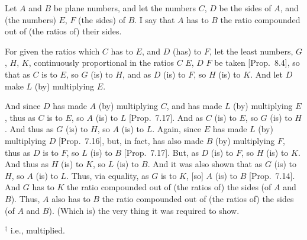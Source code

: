 \begin{Parallel}{}{}
{Let $A$ and $B$ be plane numbers, and let the numbers $C$, $D$ be the
sides of $A$, and (the numbers) $E$, $F$ (the sides) of $B$. I say that $A$ has to $B$ the ratio compounded out of (the ratios of)  their sides.

For given the ratios which $C$ has to $E$, and $D$ (has) to $F$, let the least numbers, $G$, $H$, $K$, continuously proportional in the
ratios $C$ $E$, $D$ $F$ be taken [Prop.~8.4], so that as $C$ is to $E$, so
$G$ (is) to $H$, and as $D$ (is) to $F$, so $H$ (is) to $K$. And let $D$ make $L$ (by) multiplying $E$. 

And since $D$ has made $A$ (by) multiplying $C$, and has made $L$ (by)
multiplying $E$, thus as $C$ is to  $E$, so $A$ (is) to $L$ [Prop.~7.17]. And as $C$ (is) to $E$, so $G$ (is) to
$H$. And thus as $G$ (is) to $H$, so $A$ (is) to $L$. Again, since
$E$ has made $L$ (by) multiplying $D$ [Prop.~7.16],
but, in fact, has also made $B$ (by) multiplying $F$, thus as $D$ is to 
$F$, so $L$ (is) to $B$  [Prop.~7.17]. But,
as $D$ (is) to $F$, so $H$ (is) to $K$.  And thus as $H$ (is) to $K$, so
$L$ (is) to $B$. And it was also shown that as $G$ (is) to $H$, so $A$ (is)
to $L$. Thus, via equality, as $G$ is to $K$, [so] $A$ (is) to $B$ [Prop.~7.14]. 
And $G$ has to $K$ the ratio compounded out of (the ratios
of) the sides (of $A$ and $B$). Thus, $A$ also has to $B$ the ratio
compounded out of (the ratios of) the sides (of $A$ and $B$). (Which is)
the very thing it was required to show.}
\end{Parallel}
{\footnotesize\noindent$^\dag$ {\rm i.e.}, multiplied.}


